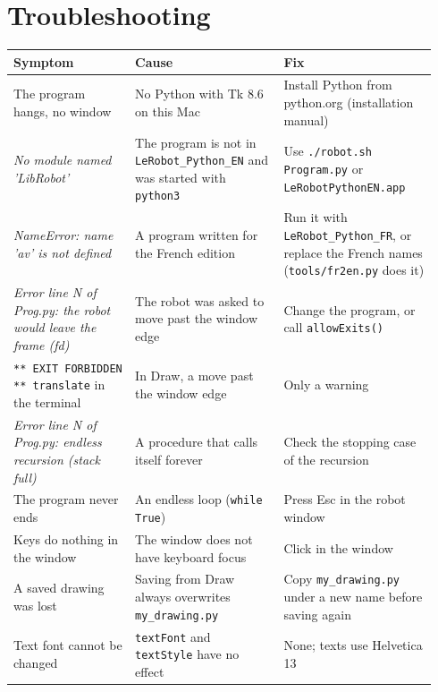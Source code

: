 \documentclass[11pt,a4paper]{article}
\newcommand{\kbd}[1]{\texttt{#1}}
\begin{document}
\section{Troubleshooting}

\begin{longtable}{@{}p{0.27\linewidth} p{0.33\linewidth} p{0.34\linewidth}@{}}
\toprule
\textbf{Symptom} & \textbf{Cause} & \textbf{Fix} \\
\midrule
\endhead
\bottomrule
\endfoot
The program hangs, no window & No Python with Tk 8.6 on this Mac & Install Python from python.org (installation manual) \\
\addlinespace
\emph{No module named 'LibRobot'} & The program is not in \kbd{LeRobot\_Python\_EN} and was started with \kbd{python3} & Use \kbd{./robot.sh Program.py} or \kbd{LeRobotPythonEN.app} \\
\addlinespace
\emph{NameError: name 'av' is not defined} & A program written for the French edition & Run it with \kbd{LeRobot\_Python\_FR}, or replace the French names (\kbd{tools/fr2en.py} does it) \\
\addlinespace
\emph{Error line N of Prog.py: the robot would leave the frame (fd)} & The robot was asked to move past the window edge & Change the program, or call \kbd{allowExits()} \\
\addlinespace
\kbd{** EXIT FORBIDDEN ** translate} in the terminal & In Draw, a move past the window edge & Only a warning \\
\addlinespace
\emph{Error line N of Prog.py: endless recursion (stack full)} & A procedure that calls itself forever & Check the stopping case of the recursion \\
\addlinespace
The program never ends & An endless loop (\kbd{while True}) & Press Esc in the robot window \\
\addlinespace
Keys do nothing in the window & The window does not have keyboard focus & Click in the window \\
\addlinespace
A saved drawing was lost & Saving from Draw always overwrites \kbd{my\_drawing.py} & Copy \kbd{my\_drawing.py} under a new name before saving again \\
\addlinespace
Text font cannot be changed & \kbd{textFont} and \kbd{textStyle} have no effect & None; texts use Helvetica 13 \\
\end{longtable}
\end{document}
